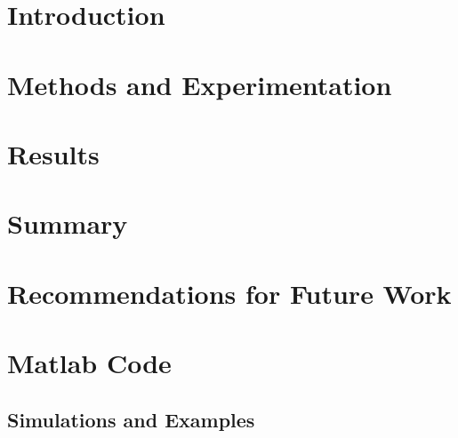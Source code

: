 \documentclass[12pt,american]{report}
\begin{document}

\renewcommand\thepage{}

\newpage
\mbox{}
\newpage

\renewcommand\thepage{\arabic{page}}
\setcounter{page}{2}

\doublespacing%




\singlespacing%
\tableofcontents             %
\listoffigures               %

\cleardoublepage%


\doublespacing%
%


\chapter{Introduction}

\chapter{Methods and Experimentation}



\chapter{Results}

\chapter{Summary}

\chapter{Recommendations for Future Work}


\appendix
\chapter{Matlab Code}
\section{Simulations and Examples}





\end{document}
